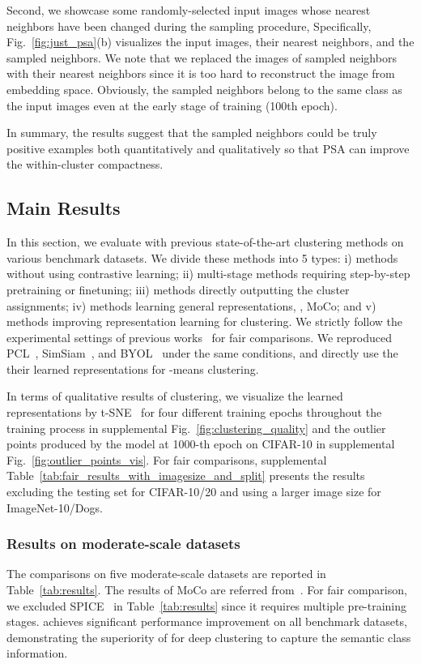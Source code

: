 Second, we showcase some randomly-selected input images whose nearest neighbors have been changed during the sampling procedure, Specifically, Fig.~\ref{fig:just_psa}(b) visualizes the input images, their nearest neighbors, and the sampled neighbors. We note that we replaced the images of sampled neighbors with their nearest neighbors since it is too hard to reconstruct the image from embedding space. Obviously, the sampled neighbors belong to the same class as the input images even at the early stage of training (\ie 100th epoch).

In summary, the results suggest that the sampled neighbors could be truly positive examples both quantitatively and qualitatively so that PSA can improve the within-cluster compactness.



\subsection{Main Results}



In this section, we evaluate \methodname with previous state-of-the-art clustering methods on various benchmark datasets. We divide these methods into 5 types: i) methods without using contrastive learning; ii) multi-stage methods requiring step-by-step pretraining or finetuning; iii) methods directly outputting the cluster assignments; iv) methods learning general representations, \eg, MoCo; and v) methods improving representation learning for clustering. We strictly follow the experimental settings of previous works~\cite{tsai2020mice,tao2021clustering} for fair comparisons. We reproduced PCL~\cite{li2020prototypical}, SimSiam~\cite{chen2020simple}, and BYOL~\cite{grill2020bootstrap} under the same conditions, and directly use the their learned representations for -means clustering.

In terms of qualitative results of clustering, we visualize the learned representations by t-SNE~\cite{van2008visualizing} for four different training epochs throughout the training process in supplemental Fig.~\ref{fig:clustering_quality} and the outlier points produced by the model at 1000-th epoch on CIFAR-10 in supplemental Fig.~\ref{fig:outlier_points_vis}.
For fair comparisons, supplemental Table~\ref{tab:fair_results_with_imagesize_and_split} presents the results excluding the testing set for CIFAR-10/20 and using a larger image size for ImageNet-10/Dogs.

\subsubsection{Results on moderate-scale datasets}
The comparisons on five moderate-scale datasets are reported in Table~\ref{tab:results}. The results of MoCo are referred from~\cite{tsai2020mice}. For fair  comparison, we excluded SPICE~\cite{niu2021spice} in Table~\ref{tab:results} since it requires multiple pre-training stages. 
\methodname achieves significant performance improvement on all benchmark datasets, demonstrating the superiority of \methodname for deep clustering to capture the semantic class information.

